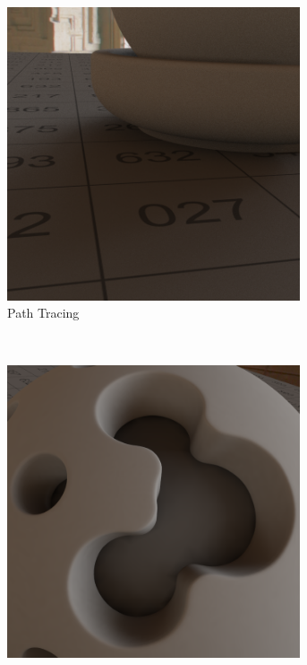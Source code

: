 \begin{figure}[H]
\begin{subfigure}[t]{0.5\textwidth}
				\includegraphics[width=0.95\textwidth]{pic/irrmap-shaderball_e4-ref.png}
				\caption{Path Tracing}
				\label{subfig:irrmap-shaderball-e4-ref}
			\end{subfigure}
			\medskip \\
			\begin{subfigure}[t]{0.5\textwidth}
				\center
				\includegraphics[width=0.95\textwidth]{pic/irrmap-shaderball_e3-vmap.png}

\end{subfigure}
\end{figure}
